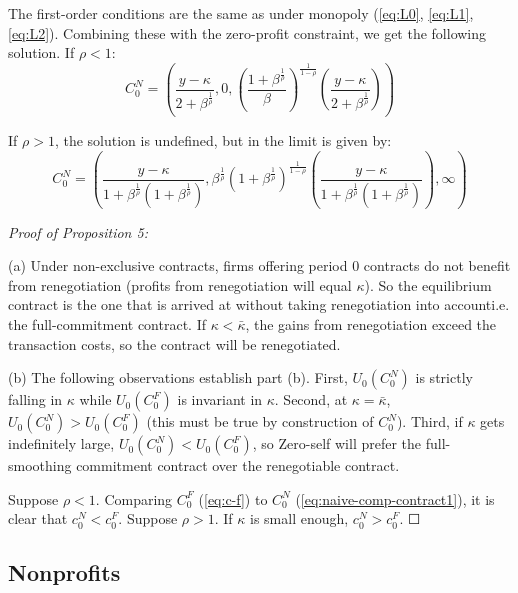 \documentclass[11pt,english]{article}
\theoremstyle{plain}
\theoremstyle{definition}
\begin{document}
The first-order conditions are the same as under monopoly (\ref{eq:L0},
\ref{eq:L1}, \ref{eq:L2}). Combining these with the zero-profit
constraint, we get the following solution. If $\rho<1$: 
\begin{equation}
C_{0}^{N}=\left(\frac{y-\kappa}{2+\beta^{\frac{1}{\rho}}},0,\left(\frac{1+\beta^{\frac{1}{\rho}}}{\beta}\right)^{\frac{1}{1-\rho}}\left(\frac{y-\kappa}{2+\beta^{\frac{1}{\rho}}}\right)\right)\label{eq:naive-comp-contract1}
\end{equation}

If $\rho>1$, the solution is undefined, but in the limit is given
by: 
\begin{equation}
  C_{0}^{N}=\left(\frac{y-\kappa}{1+\beta^{\frac{1}{\rho}}
  \left(1+\beta^{\frac{1}{\rho}}\right)},\beta^{\frac{1}{\rho}}
  \left(1+\beta^{\frac{1}{\rho}}\right)^{\frac{1}{1-\rho}}
  \left(\frac{y-\kappa}{1+\beta^{\frac{1}{\rho}}\left(1+\beta^{\frac{1}{\rho}}\right)}\right),
  \infty\right)\label{eq:naive-comp-contract2}
\end{equation}

\emph{Proof of Proposition 5:}

(a) Under non-exclusive contracts, firms offering period 0 contracts
do not benefit from renegotiation (profits from renegotiation will
equal $\kappa$). So the equilibrium contract is the one that is arrived
at without taking renegotiation into account\textendash i.e. the full-commitment
contract. If $\kappa<\bar{\kappa}$, the gains from renegotiation
exceed the transaction costs, so the contract will be renegotiated.

(b) The following observations establish part (b). First, $U_{0}\left(C_{0}^{N}\right)$
is strictly falling in $\kappa$ while $U_{0}\left(C_{0}^{F}\right)$
is invariant in $\kappa$. Second, at 
$\kappa=\bar{\kappa}$, $U_{0}\left(C_{0}^{N}\right)>U_{0}\left(C_{0}^{F}\right)$
(this must be true by construction of $C_{0}^{N}$). Third, if $\kappa$
gets indefinitely large, $U_{0}\left(C_{0}^{N}\right)<U_{0}\left(C_{0}^{F}\right)$,
so Zero-self will prefer the full-smoothing commitment contract over
the renegotiable contract. 

Suppose $\rho<1$. Comparing $C_{0}^{F}$ (\ref{eq:c-f}) to $C_{0}^{N}$
(\ref{eq:naive-comp-contract1}), it is clear that $c_{0}^{N}<c_{0}^{F}$.
Suppose $\rho>1$. If $\kappa$ is small enough, $c_{0}^{N}>c_{0}^{F}$.
$\Square$

\subsection{Nonprofits}
\end{document}
